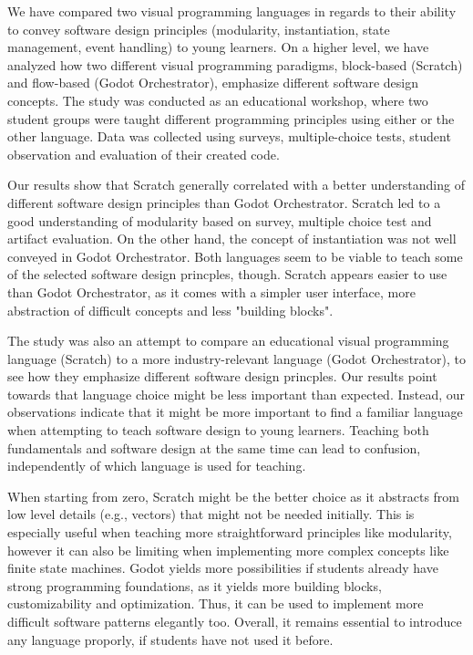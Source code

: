We have compared two visual programming languages in regards to their ability
to convey software design principles (modularity, instantiation, state management,
event handling) to young learners. On a higher level, we have analyzed how two
different visual programming paradigms, block-based (Scratch) and flow-based
(Godot Orchestrator), emphasize different software design concepts. The study
was conducted as an educational workshop, where two student groups were taught
different programming principles using either or the other language. Data was
collected using surveys, multiple-choice tests, student observation and
evaluation of their created code.

Our results show that Scratch generally correlated with a better understanding
of different software design principles than Godot Orchestrator. Scratch led to
a good understanding of modularity based on survey, multiple choice test and
artifact evaluation. On the other hand, the concept of instantiation was not
well conveyed in Godot Orchestrator. Both languages seem to be viable to teach
some of the selected software design princples, though. Scratch appears easier
to use than Godot Orchestrator, as it comes with a simpler user interface, more
abstraction of difficult concepts and less "building blocks".

The study was also an attempt to compare an educational visual programming language
(Scratch) to a more industry-relevant language (Godot Orchestrator), to see how
they emphasize different software design princples. Our results point towards that
language choice might be less important than expected. Instead, our observations
indicate that it might be more important to find a familiar language when
attempting to teach software design to young learners. Teaching both fundamentals
and software design at the same time can lead to confusion, independently of
which language is used for teaching.

When starting from zero, Scratch might be the better choice as it abstracts from
low level details (e.g., vectors) that might not be needed initially. This is
especially useful when teaching more straightforward principles like modularity,
however it can also be limiting when implementing more complex concepts like
finite state machines. Godot yields more possibilities if students already have
strong programming foundations, as it yields more building blocks, customizability
and optimization. Thus, it can be used to implement more difficult software
patterns elegantly too. Overall, it remains essential to introduce any language
proporly, if students have not used it before.

